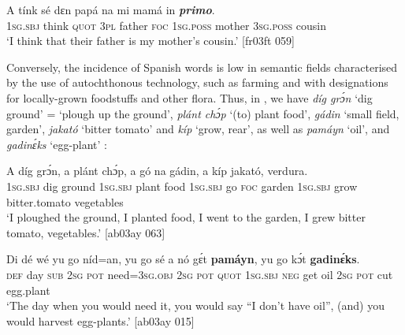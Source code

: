 \ea%
    \label{ex:key:1763}
    \gll A    tínk    sé    dɛn  papá  na  mi    mamá  in    \textbf{\textit{primo}}.\\
\textsc{1sg.sbj}  think  \textsc{quot}    \textsc{3pl}  father  \textsc{foc}  \textsc{1sg.poss}  mother  \textsc{3sg.poss}  cousin\\

\glt ‘I think that their father is my mother’s cousin.’ [fr03ft 059]
\z

Conversely, the incidence of Spanish words is low in semantic fields characterised by the use of autochthonous technology, such as farming and with designations for locally-grown foodstuffs and other flora. Thus, in , we have \textit{díg grɔ́n} ‘dig ground’ = ‘plough up the ground’, \textit{plánt chɔ́p} ‘(to) plant food’, \textit{gádin} ‘small field, garden’, \textit{jakató} ‘bitter tomato’ and \textit{kíp} ‘grow, rear’, as well as \textit{pamáyn} ‘oil’, and \textit{gadinɛ́ks} ‘egg-plant’ :


\ea%
    \label{ex:key:1764}
    \gll A    díg  grɔ́n,  a    plánt chɔ́p,  a    gó  na  gádin,
a    kíp    jakató,    verdura.\\
\textsc{1sg.sbj}  dig  ground  \textsc{1sg.sbj}  plant  food    \textsc{1sg.sbj}  go  \textsc{foc}  garden
\textsc{1sg.sbj}  grow  bitter.tomato  vegetables\\

\glt ‘I ploughed the ground, I planted food, I went to the garden, I grew bitter tomato, 
vegetables.’ [ab03ay 063]
\z


\ea%
    \label{ex:key:1765}
    \gll Di  dé  wé  yu  go  níd=an,    yu  go  sé  a    nó  gɛ́t
\textbf{pamáyn},   yu  go  kɔ́t \textbf{gadinɛ́ks}.\\
\textsc{def}  day  \textsc{sub}  \textsc{2sg}  \textsc{pot}  need=\textsc{3sg.obj}  \textsc{2sg}  \textsc{pot}  \textsc{quot} \textsc{1sg.sbj}  \textsc{neg}  get
oil      \textsc{2sg}  \textsc{pot}  cut  egg.plant\\

\glt ‘The day when you would need it, you would say “I don’t have oil”, (and) you would harvest egg-plants.’ [ab03ay 015]
\z

